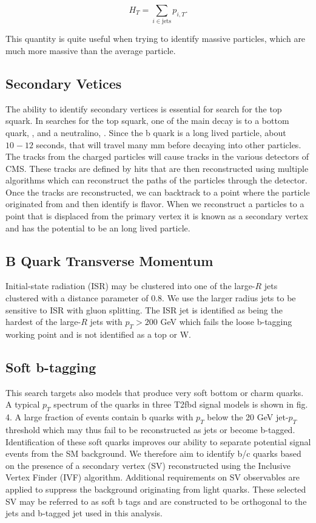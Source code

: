 \begin{equation}
H_T=\sum_{i\in\text{jets}}p_{i,T}.
\end{equation}

This quantity is quite useful when trying to identify massive particles, which are much more massive than the average particle. 

\subsection{Secondary Vetices}\label{SV}

The ability to identify secondary vertices is essential for search for the top squark. In searches for the top squark, one of the main decay is to a bottom quark, \bquark, and a neutralino, \neutralino. Since the b quark is a long lived particle, about $10^{}-12$ seconds, that will travel many mm before decaying into other particles. The tracks from the charged particles will cause tracks in the various detectors of CMS. These tracks are defined by hits that are then reconstructed using multiple algorithms which can reconstruct the paths of the particles through the detector. Once the tracks are reconstructed, we can backtrack to a point where the particle originated from and then identify is flavor. When we reconstruct a particles to a point that is displaced from the primary vertex it is known as a secondary vertex and has the potential to be an long lived particle. 

\subsection{B Quark Transverse Momentum}\label{bTransverseMomentum}

Initial-state radiation (ISR) may be clustered into one of the large-$R$ jets clustered with a distance parameter of $0.8$. We use the larger radius jets to be sensitive to ISR with gluon splitting. The ISR jet is identified as being the hardest of the large-$R$ jets with $p_T>200$ GeV which fails the loose b-tagging working point and is not identified as a top or W. 

\subsection{Soft b-tagging} \label{softB}
This search targets also models that produce very soft bottom or charm quarks. A typical $p_T$ spectrum of the \bquark quarks in three T2fbd signal models is shown in fig. 4. A large fraction of events contain b quarks with $p_T$ below the 20 GeV jet-$p_T$ threshold which may thus fail to be reconstructed as jets or become b-tagged. Identification of these soft quarks improves our ability to separate potential signal events from the SM background. We therefore aim to identify b/c quarks based on the presence of a secondary vertex (SV) reconstructed using the Inclusive Vertex Finder (IVF) algorithm. Additional requirements on SV observables are applied to suppress the background originating from light quarks. These selected SV may be referred to as soft b tags and are constructed to be orthogonal to the jets and b-tagged jet used in this analysis. 

